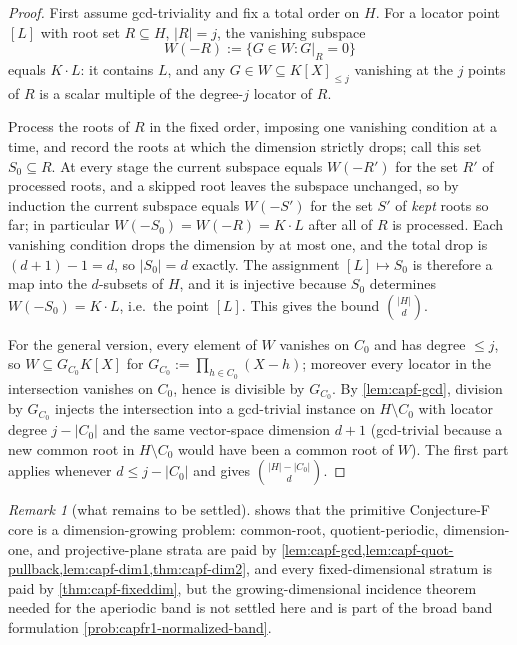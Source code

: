 \documentclass[11pt]{article}
\theoremstyle{definition}
\theoremstyle{remark}
\newtheorem{remark}[remark]{Remark}
\begin{document}
\begin{proof}
First assume gcd-triviality and fix a total order on $H$.  For a locator point $[L]$ with root set $R\subseteq H$, $|R|=j$, the vanishing subspace
\[
        W(-R):=\{G\in W:G|_R=0\}
\]
equals $K\cdot L$: it contains $L$, and any $G\in W\subseteq K[X]_{\le j}$ vanishing at the $j$ points of $R$ is a scalar multiple of the degree-$j$ locator of $R$.

Process the roots of $R$ in the fixed order, imposing one vanishing condition at a time, and record the roots at which the dimension strictly drops; call this set $S_0\subseteq R$.  At every stage the current subspace equals $W(-R')$ for the set $R'$ of processed roots, and a skipped root leaves the subspace unchanged, so by induction the current subspace equals $W(-S')$ for the set $S'$ of \emph{kept} roots so far; in particular $W(-S_0)=W(-R)=K\cdot L$ after all of $R$ is processed.  Each vanishing condition drops the dimension by at most one, and the total drop is $(d+1)-1=d$, so $|S_0|=d$ exactly.  The assignment $[L]\mapsto S_0$ is therefore a map into the $d$-subsets of $H$, and it is injective because $S_0$ determines $W(-S_0)=K\cdot L$, i.e.\ the point $[L]$.  This gives the bound $\binom{|H|}d$.

For the general version, every element of $W$ vanishes on $C_0$ and has degree $\le j$, so $W\subseteq G_{C_0}K[X]$ for $G_{C_0}:=\prod_{h\in C_0}(X-h)$; moreover every locator in the intersection vanishes on $C_0$, hence is divisible by $G_{C_0}$.  By \cref{lem:capf-gcd}, division by $G_{C_0}$ injects the intersection into a gcd-trivial instance on $H\setminus C_0$ with locator degree $j-|C_0|$ and the same vector-space dimension $d+1$ \textup{(gcd-trivial because a new common root in $H\setminus C_0$ would have been a common root of $W$)}.  The first part applies whenever $d\le j-|C_0|$ and gives $\binom{|H|-|C_0|}d$.
\end{proof}

\begin{remark}[what remains to be settled]\label{rem:capf-conjf-open}
 shows that the primitive Conjecture-F core is a dimension-growing problem: common-root, quotient-periodic, dimension-one, and projective-plane strata are paid by \cref{lem:capf-gcd,lem:capf-quot-pullback,lem:capf-dim1,thm:capf-dim2}, and every fixed-dimensional stratum is paid by \cref{thm:capf-fixeddim}, but the growing-dimensional incidence theorem needed for the aperiodic band is not settled here and is part of the broad band formulation \cref{prob:capfr1-normalized-band}.
\end{remark}
\end{document}
